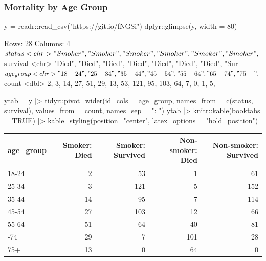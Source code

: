 \documentclass[a4paper]{article}
\begin{document}
\subsubsection{Mortality by Age Group}
\begin{Schunk}
\begin{Sinput}
y = readr::read_csv("https://git.io/fNGSi")
dplyr::glimpse(y, width = 80)
\end{Sinput}
\begin{Soutput}
Rows: 28
Columns: 4
$ status    <chr> "Smoker", "Smoker", "Smoker", "Smoker", "Smoker", "Smoker", ~
$ survival  <chr> "Died", "Died", "Died", "Died", "Died", "Died", "Died", "Sur~
$ age_group <chr> "18-24", "25-34", "35-44", "45-54", "55-64", "65-74", "75+",~
$ count     <dbl> 2, 3, 14, 27, 51, 29, 13, 53, 121, 95, 103, 64, 7, 0, 1, 5, ~
\end{Soutput}
\begin{Sinput}
ytab = y |>
  tidyr::pivot_wider(id_cols = age_group, 
                     names_from = c(status, survival), 
                     values_from = count,
                     names_sep = ": ")
ytab |> 
  knitr::kable(booktabs = TRUE) |>
  kable_styling(position="center", latex_options = "hold_position")
\end{Sinput}
\begin{table}[!h]
\centering
\begin{tabular}{lrrrr}
\toprule
age\_group & Smoker: Died & Smoker: Survived & Non-smoker: Died & Non-smoker: Survived\\
\midrule
18-24 & 2 & 53 & 1 & 61\\
25-34 & 3 & 121 & 5 & 152\\
35-44 & 14 & 95 & 7 & 114\\
45-54 & 27 & 103 & 12 & 66\\
55-64 & 51 & 64 & 40 & 81\\
\addlinespace
65-74 & 29 & 7 & 101 & 28\\
75+ & 13 & 0 & 64 & 0\\
\bottomrule
\end{tabular}
\end{table}




\end{Schunk}
\end{document}

